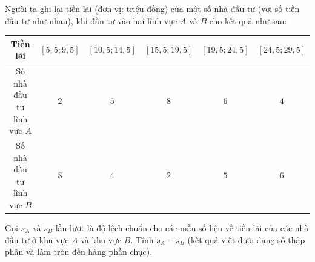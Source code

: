 \begin{bt}%

	Người ta ghi lại tiền lãi (đơn vị: triệu đồng) của một số nhà đầu tư (với số tiền đầu tư như nhau), khi đầu tư vào hai lĩnh vực $A$ và $B$ cho kết quả như sau:
	\begin{center}
		\begin{tabular}{|c|c|c|c|c|c|}
			\hline
			Tiền lãi&$[5{,}5;9{,}5]$&$[10{,}5;14{,}5]$&$[15{,}5;19{,}5]$&$[19{,}5;24{,}5]$&$[24{,}5;29{,}5]$\\
			\hline
			Số nhà đầu tư lĩnh vực $A$&$2$&$5$&$8$&$6$&$4$\\
			\hline
			Số nhà đầu tư lĩnh vực $B$&$8$&$4$&$2$&$5$&$6$\\
			\hline
		\end{tabular}
	\end{center}
	Gọi $s_A$ và $s_B$ lần lượt là độ lệch chuẩn cho các mẫu số liệu về tiền lãi của các nhà đầu tư ở khu vực $A$ và khu vực $B$. Tính $s_A-s_B$ (kết quả viết dưới dạng số thập phân và làm tròn đến hàng phần chục).
	

\end{bt}
